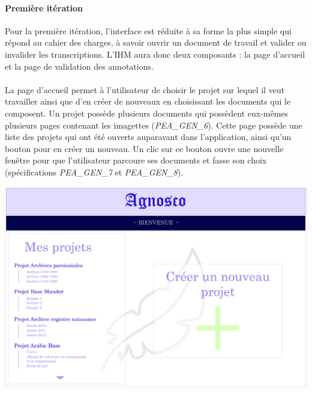 \paragraph{Première itération}
Pour la première itération, l’interface est réduite à sa forme la plus simple qui répond au cahier des charges, à savoir ouvrir un document de travail et valider ou invalider les transcriptions. L’IHM aura donc deux composants : la page d’accueil et la page de validation des annotations.

\paragraph{}
La page d’accueil permet à l’utilisateur de choisir le projet sur lequel il veut travailler ainsi que d'en créer de nouveaux en choisissant les documents qui le composent. Un projet possède plusieurs documents qui possèdent eux-mêmes plusieurs pages contenant les imagettes (\textit{PEA\_GEN\_6}). Cette page possède une liste des projets qui ont été ouverts auparavant dans l’application, ainsi qu’un bouton pour en créer un nouveau. Un clic sur ce bouton ouvre une nouvelle fenêtre pour que l’utilisateur parcoure ses documents et fasse son choix (spécifications \textit{PEA\_GEN\_7} et \textit{PEA\_GEN\_8}).

\newpage{}
\begin{mdframed}[frametitle={Figure 1 : Maquette de la page d'accueil de l'IHM}, innerbottommargin=10]
\begin{center}
\includegraphics[scale=0.04]{assets/maquetteIHMaccueil.jpg}
\end{center}
\end{mdframed}

